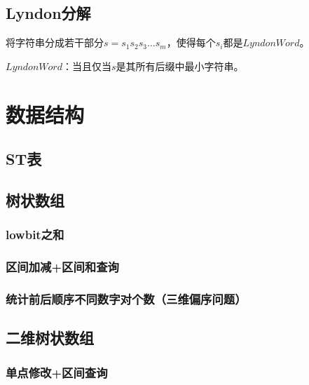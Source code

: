 \documentclass[landscape,twoside,a4paper]{article}
\begin{document}
\subsection{Lyndon分解}
将字符串分成若干部分$s = s_{1}s_{2}s_{3}...s_{m}$，使得每个$s_{i}$都是$Lyndon Word$。\par
$Lyndon Word$：当且仅当$s$是其所有后缀中最小字符串。



\section{数据结构}

\subsection{ST表}



\subsection{树状数组}

\subsubsection{lowbit之和}


\subsubsection{区间加减+区间和查询}


\subsubsection{统计前后顺序不同数字对个数（三维偏序问题）}



\subsection{二维树状数组}

\subsubsection{单点修改+区间查询}

\end{document}
